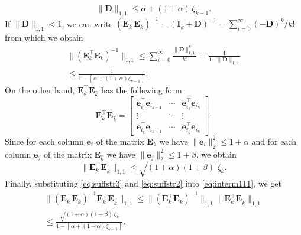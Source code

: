 \documentclass[10pt,twocolumn,twoside] {IEEEtran}
\begin{document}
{\begin{equation}
\| {\boldsymbol{D}} \|_{1,1} \leq \alpha + (1+\alpha) \, \zeta_{k-1}.
\end{equation}
If $\| {\boldsymbol{D}} \|_{1,1} < 1$, we can write $({\boldsymbol{E}}_k^{\top} {\boldsymbol{E}}_k)^{-1} = ({\boldsymbol{I}}_k + {\boldsymbol{D}})^{-1} = \sum_{i=0}^{\infty}{ (-{\boldsymbol{D}})^k / k! }\,$ from which we obtain
\begin{multline}
\label{eq:suffstr3}
\| ( {\boldsymbol{E}}_k^{\top} {\boldsymbol{E}}_k )^{-1} \|_{1,1} \leq \sum_{i=0}^{\infty}{ \frac{\| {\boldsymbol{D}} \|_{1,1}^k}{k!} } = \frac{1}{1-\| {\boldsymbol{D}} \|_{1,1}} \\\leq \frac{1}{ 1 - [ \,\alpha + (1+\alpha) \zeta_{k-1} \, ] }.
\end{multline}
On the other hand, ${\boldsymbol{E}}_k^{\top} {\boldsymbol{E}}_{\widehat{k}}$ has the following form 
\begin{equation}
{\boldsymbol{E}}_k^{\top} {\boldsymbol{E}}_{\widehat{k}} = \begin{bmatrix} {\boldsymbol{e}}_{i_1}^{\top} {\boldsymbol{e}}_{i_{k+1}} & \cdots & {\boldsymbol{e}}_{i_1}^{\top} {\boldsymbol{e}}_{i_n} \\ \vdots & \ddots & \vdots \\ {\boldsymbol{e}}_{i_k}^{\top} {\boldsymbol{e}}_{i_{k+1}} & \cdots & {\boldsymbol{e}}_{i_k}^{\top} {\boldsymbol{e}}_{i_n}  \end{bmatrix}. 
\end{equation}
Since for each column ${\boldsymbol{e}}_i$ of the matrix ${\boldsymbol{E}}_k$ we have $\| {\boldsymbol{e}}_i \|_2^2 \leq 1+\alpha$ and for each column ${\boldsymbol{e}}_j$ of the matrix ${\boldsymbol{E}}_{\widehat{k}}$ we have $\| {\boldsymbol{e}}_j \|_2^2 \leq 1+\beta$, we obtain 
\begin{equation}
\label{eq:suffstr2}
\| {\boldsymbol{E}}_k^{\top} {\boldsymbol{E}}_{\widehat{k}}  \|_{1,1} \leq \sqrt{(1+\alpha) (1+\beta)} \; \zeta_k.
\end{equation}
Finally, substituting \eqref{eq:suffstr3} and \eqref{eq:suffstr2} into \eqref{eq:interm111}, we get
\begin{multline}
 \| ({\boldsymbol{E}}_k^{\top} {\boldsymbol{E}}_k)^{-1} {\boldsymbol{E}}_k^{\top} {\boldsymbol{E}}_{\widehat{k}} \|_{1,1} \leq   \| ({\boldsymbol{E}}_k^{\top} {\boldsymbol{E}}_k)^{-1} \|_{1,1} \| {\boldsymbol{E}}_k^{\top} {\boldsymbol{E}}_{\widehat{k}} \|_{1,1} \\ \leq \frac{ \sqrt{(1+\alpha) (1+\beta)} \, \zeta_{k} }{ 1 - [\, \alpha + (1+\alpha) \zeta_{k-1} \, ] }.
\end{multline}

}
\end{document}
